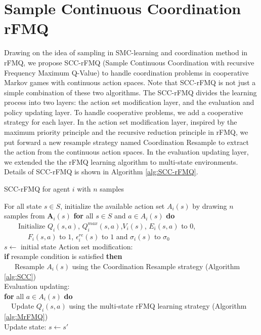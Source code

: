 \documentclass[journal,transmag]{IEEEtran}
\begin{document}
\section{Sample Continuous Coordination rFMQ}
Drawing on the idea of sampling in SMC-learning and coordination method in rFMQ, we propose SCC-rFMQ (Sample Continuous Coordination with recursive Frequency Maximum Q-Value) to handle coordination problems in cooperative Markov games with continuous action spaces. Note that SCC-rFMQ is not just a simple combination of these two algorithms. The SCC-rFMQ divides the learning process into two layers: the action set modification layer, and the evaluation and policy updating layer. To handle cooperative problems, we add a cooperative strategy for each layer. In the action set modification layer, inspired by the maximum priority principle and the recursive reduction principle in rFMQ, we put forward a new resample strategy named Coordination Resample to extract the action from the continuous action spaces. In the evaluation updating layer, we extended the the rFMQ learning algorithm to multi-state environments. Details of SCC-rFMQ is shown in Algorithm \ref{alg:SCC-rFMQ}.

\begin{algorithm}[h]
\caption{SCC-rFMQ for agent $i$ with $n$ samples}
\label{alg:SCC-rFMQ}
\begin{algorithmic}[1]
\STATE For all state $s \in S$, initialize the available action set $A_{i}(s)$ by drawing $n$ samples from $\mathbf{A}_i(s)$
\STATE \textbf{for} all $s \in S$ and $a\in A_{i}(s)$ \textbf{do} \\
         ~~~~Initialize $Q_{i}(s,a)$, $Q_{i}^{max}(s,a)$,$V_i(s)$, $E_i(s,a)$ to 0,\\
         ~~~~~~ $F_i(s,a)$ to $1$, $\epsilon_i^{re}(s)$ to $1$ and $\sigma_i(s)$ to $\sigma_0 $\\\label{initialize}
\REPEAT
\STATE $s \leftarrow $ initial state
\REPEAT
\STATE Action set modification: \\
       \textbf{if} resample condition is satisfied \textbf{then} \\
         ~~~Resample $A_{i}(s)$ using the Coordination Resample strategy (Algorithm \ref{alg:SCC}) \\ \label{SCC}
\STATE Evaluation updating:\\
       \textbf{for} all $a\in A_{i}(s)$ \textbf{do} \\
         ~~Update $Q_{i}(s,a)$ using the multi-state rFMQ learning strategy (Algorithm \ref{alg:MrFMQ}) \\ \label{rFMQ}
\STATE Update state: $s \leftarrow s'$
\end{algorithmic}
\end{algorithm}
\end{document}
